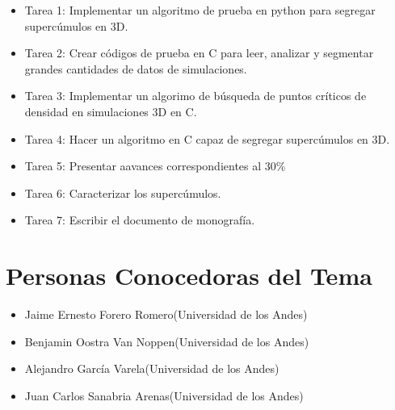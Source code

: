 \documentclass[12pt]{article}
\begin{document}
\begin{itemize}
	\item Tarea 1: Implementar un algoritmo de prueba en python para segregar  supercúmulos en 3D.
	\item Tarea 2: Crear códigos de prueba en C para leer, analizar y segmentar grandes cantidades de datos de simulaciones.
    
	\item Tarea 3: Implementar un algorimo de búsqueda de puntos críticos de densidad en simulaciones 3D en C.
	\item Tarea 4: Hacer un algoritmo en C capaz de segregar supercúmulos en 3D.
    \item Tarea 5: Presentar aavances correspondientes al 30\%
    \item Tarea 6: Caracterizar los supercúmulos.
    \item Tarea 7: Escribir el documento de monografía.
    
    
\end{itemize}

\section{Personas Conocedoras del Tema}


\begin{itemize}
	\item Jaime Ernesto Forero Romero(Universidad de los Andes)
	\item Benjamin Oostra Van Noppen(Universidad de los Andes)
	\item Alejandro García Varela(Universidad de los Andes)
    \item Juan Carlos Sanabria Arenas(Universidad de los Andes)
\end{itemize}
\end{document}
